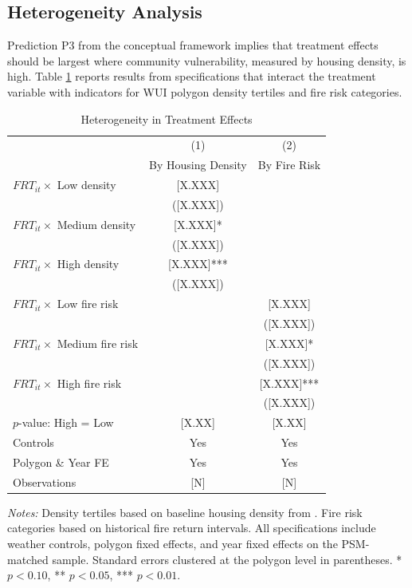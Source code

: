 \documentclass[12pt, letterpaper]{article}
\begin{document}
\subsection{Heterogeneity Analysis}

Prediction P3 from the conceptual framework implies that treatment effects should be largest where community vulnerability, measured by housing density, is high. Table \ref{tab:heterogeneity} reports results from specifications that interact the treatment variable with indicators for WUI polygon density tertiles and fire risk categories.

\begin{table}[H]
\centering
\small
\begin{threeparttable}
\caption{Heterogeneity in Treatment Effects}
\label{tab:heterogeneity}
\begin{tabular}{lcc}
\toprule
& (1) & (2) \\
& By Housing Density & By Fire Risk \\
\midrule
$FRT_{it} \times$ Low density & [X.XXX] & \\
& ([X.XXX]) & \\
$FRT_{it} \times$ Medium density & [X.XXX]* & \\
& ([X.XXX]) & \\
$FRT_{it} \times$ High density & [X.XXX]*** & \\
& ([X.XXX]) & \\
$FRT_{it} \times$ Low fire risk & & [X.XXX] \\
& & ([X.XXX]) \\
$FRT_{it} \times$ Medium fire risk & & [X.XXX]* \\
& & ([X.XXX]) \\
$FRT_{it} \times$ High fire risk & & [X.XXX]*** \\
& & ([X.XXX]) \\
\midrule
$p$-value: High = Low & [X.XX] & [X.XX] \\
Controls & Yes & Yes \\
Polygon \& Year FE & Yes & Yes \\
Observations & [N] & [N] \\
\bottomrule
\end{tabular}
\begin{tablenotes}
\small
\item \textit{Notes:} Density tertiles based on baseline housing density from \citet{radeloff2018}. Fire risk categories based on historical fire return intervals. All specifications include weather controls, polygon fixed effects, and year fixed effects on the PSM-matched sample. Standard errors clustered at the polygon level in parentheses. * $p<0.10$, ** $p<0.05$, *** $p<0.01$.
\end{tablenotes}
\end{threeparttable}
\end{table}
\end{document}

